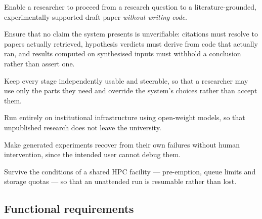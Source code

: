 \begin{description}[style=unboxed,leftmargin=0pt,itemsep=0.3em]
  \item[\textbf{A1}] Enable a researcher to proceed from a research question to a
    literature-grounded, experimentally-supported draft paper \emph{without writing code}.
  \item[\textbf{A2}] Ensure that no claim the system presents is unverifiable: citations must
    resolve to papers actually retrieved, hypothesis verdicts must derive from code that
    actually ran, and results computed on synthesised inputs must withhold a conclusion rather
    than assert one.
  \item[\textbf{A3}] Keep every stage independently usable and steerable, so that a researcher
    may use only the parts they need and override the system's choices rather than accept them.
  \item[\textbf{A4}] Run entirely on institutional infrastructure using open-weight models, so
    that unpublished research does not leave the university.
  \item[\textbf{A5}] Make generated experiments recover from their own failures without human
    intervention, since the intended user cannot debug them.
  \item[\textbf{A6}] Survive the conditions of a shared HPC facility --- pre-emption, queue
    limits and storage quotas --- so that an unattended run is resumable rather than lost.
\end{description}

\subsection{Functional requirements}

